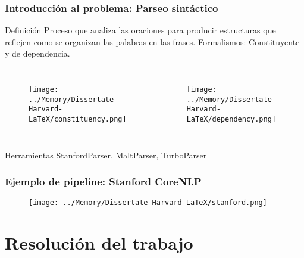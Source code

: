 \documentclass{beamer}
\begin{document}
\begin{frame}
\frametitle{Introducción al problema: Parseo sintáctico}
\begin{block}{Definición}
Proceso que analiza las oraciones para producir estructuras que reflejen como se organizan las palabras en las frases. Formalismos: Constituyente y de dependencia.
\end{block}
\begin{columns}[c]
\begin{figure}
\texttt{[image: ../Memory/Dissertate-Harvard-LaTeX/constituency.png]}
\end{figure}
\begin{figure}
\texttt{[image: ../Memory/Dissertate-Harvard-LaTeX/dependency.png]}
\end{figure}
\end{columns}
\begin{block}{Herramientas}
StanfordParser, MaltParser, TurboParser
\end{block}
\end{frame}

\begin{frame}
\frametitle{Ejemplo de pipeline: Stanford CoreNLP}
\begin{figure}
\texttt{[image: ../Memory/Dissertate-Harvard-LaTeX/stanford.png]}
\end{figure}

\end{frame}

\section{Resolución del trabajo}
\end{document}
